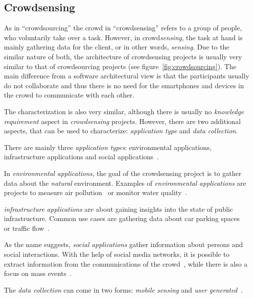 \subsection*{Crowdsensing}
As in ``crowdsourcing'' the crowd in ``crowdsensing'' refers to a group of people, who voluntarily take over a task.
However, in crowd\textit{sensing}, the task at hand is mainly gathering data for the client, or in other words, \textit{sensing}.
Due to the similar nature of both, the architecture of crowdsensing projects is usually very similar to that of crowdsourcing projects (see figure~\ref{fig:crowdsourcing}).
The main difference from a software architectural view is that the participants usually do not collaborate and thus there is no need for the smartphones and devices in the crowd to communicate with each other.

The characterization is also very similar, although there is usually no \textit{knowledge requirement} aspect in \textit{crowdsensing} projects.
However, there are two additional aspects, that can be used to characterize: \textit{application type} and \textit{data collection}.

There are mainly three \textit{application types}: environmental applications, infrastructure applications and social applications~\cite{ganti2011mobile}.

In \textit{environmental applications}, the goal of the crowdsensing project is to gather data about the \textit{natural} environment.
Examples of \textit{environmental applications} are projects to measure air pollution~\cite{hasenfratz2012participatory,sivaraman2013hazewatch,liu2018third} or monitor water quality~\cite{minkman2015citizen,rapousis2016performance,shang2023crowdwatersens}.

\textit{infrastructure applications} are about gaining insights into the state of public infrastructure.
Common use cases are gathering data about car parking spaces~\cite{villanueva2015crowdsensing,coric2013crowdsensing,rinne2014mobile} or traffic flow~\cite{wang2018city,li2019privacy,mei2020towards}.

As the name suggests, \textit{social applications} gather information about persons and social interactions.
With the help of social media networks, it is possible to extract information from the communications of the crowd~\cite{grasso2017public,cecilia2020mobile,phan2019drinks}, while there is also a focus on mass events~\cite{rahman2017location,cardone2014crowdsensing,jarvis2013ubicomp}.

The \textit{data collection} can come in two forms: \textit{mobile sensing} and \textit{user generated}~\cite{pietschmann2008croco}.

